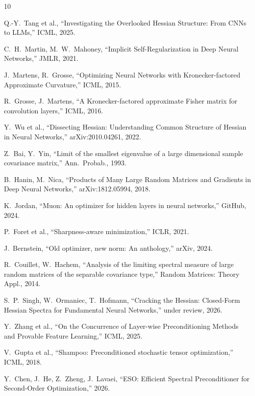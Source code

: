 \documentclass{article}
\begin{document}
\begin{thebibliography}{10}

 Q.-Y.~Tang et al., ``Investigating the Overlooked Hessian Structure: From CNNs to LLMs,'' ICML, 2025.

 C.~H.~Martin, M.~W.~Mahoney, ``Implicit Self-Regularization in Deep Neural Networks,'' JMLR, 2021.

 J.~Martens, R.~Grosse, ``Optimizing Neural Networks with Kronecker-factored Approximate Curvature,'' ICML, 2015.

 R.~Grosse, J.~Martens, ``A Kronecker-factored approximate Fisher matrix for convolution layers,'' ICML, 2016.

 Y.~Wu et al., ``Dissecting Hessian: Understanding Common Structure of Hessian in Neural Networks,'' arXiv:2010.04261, 2022.

 Z.~Bai, Y.~Yin, ``Limit of the smallest eigenvalue of a large dimensional sample covariance matrix,'' Ann.\ Probab., 1993.

 B.~Hanin, M.~Nica, ``Products of Many Large Random Matrices and Gradients in Deep Neural Networks,'' arXiv:1812.05994, 2018.

 K.~Jordan, ``Muon: An optimizer for hidden layers in neural networks,'' GitHub, 2024.

 P.~Foret et al., ``Sharpness-aware minimization,'' ICLR, 2021.

 J.~Bernstein, ``Old optimizer, new norm: An anthology,'' arXiv, 2024.

 R.~Couillet, W.~Hachem, ``Analysis of the limiting spectral measure of large random matrices of the separable covariance type,'' Random Matrices: Theory Appl., 2014.

 S.~P.~Singh, W.~Ormaniec, T.~Hofmann, ``Cracking the Hessian: Closed-Form Hessian Spectra for Fundamental Neural Networks,'' under review, 2026.

 Y.~Zhang et al., ``On the Concurrence of Layer-wise Preconditioning Methods and Provable Feature Learning,'' ICML, 2025.

 V.~Gupta et al., ``Shampoo: Preconditioned stochastic tensor optimization,'' ICML, 2018.

 Y.~Chen, J.~He, Z.~Zheng, J.~Lavaei, ``ESO: Efficient Spectral Preconditioner for Second-Order Optimization,'' 2026.


\end{thebibliography}
\end{document}

